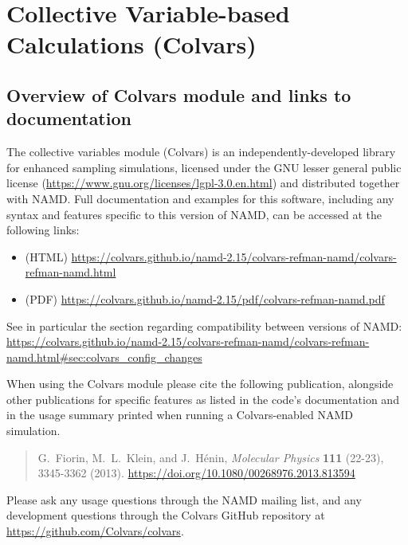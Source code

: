\section{Collective Variable-based Calculations (Colvars)}
\label{section:colvars}

\subsection{Overview of Colvars module and links to documentation}

The collective variables module (Colvars) is an independently-developed library for enhanced sampling simulations, licensed under the GNU lesser general public license (\url{https://www.gnu.org/licenses/lgpl-3.0.en.html}) and distributed together with NAMD.
Full documentation and examples for this software, including any syntax and features specific to this version of NAMD, can be accessed at the following links:
\begin{itemize}
\item (HTML) \url{https://colvars.github.io/namd-2.15/colvars-refman-namd/colvars-refman-namd.html}
\item (PDF) \url{https://colvars.github.io/namd-2.15/pdf/colvars-refman-namd.pdf}
\end{itemize}
\noindent{}See in particular the section regarding compatibility between versions of NAMD:\\
\url{https://colvars.github.io/namd-2.15/colvars-refman-namd/colvars-refman-namd.html#sec:colvars_config_changes}

When using the Colvars module please cite the following publication, alongside other publications for specific features as listed in the code's documentation and in the usage summary printed when running a Colvars-enabled NAMD simulation.

\begin{quote}
  G.\ Fiorin, M.\ L.\ Klein, and J.\ H\'enin, {\it Molecular Physics} {\bf 111} (22-23), 3345-3362 (2013). \url{https://doi.org/10.1080/00268976.2013.813594}
\end{quote}

Please ask any usage questions through the NAMD mailing list, and any development questions through the Colvars GitHub repository at \url{https://github.com/Colvars/colvars}.

